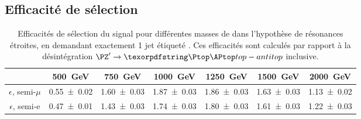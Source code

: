 
\subsection{Efficacité de sélection} \label{sec:zprime_eff_sel}

\begin{table}[p!] \centering
  \begin{tabular}{ccccccc} \toprule
    & \SI{500}{\GeV} & \SI{750}{\GeV} & \SI{1000}{\GeV} & \SI{1250}{\GeV} & \SI{1500}{\GeV} & \SI{2000}{\GeV} \\ \midrule
    $\epsilon$, semi-$\mu$ & \num{0.55 \pm 0.02} & \num{1.60 \pm 0.03} & \num{1.87 \pm 0.03} & \num{1.86 \pm 0.03} & \num{1.63 \pm 0.03} & \num{1.13 \pm 0.02} \\
    $\epsilon$, semi-e & \num{0.47 \pm 0.01} & \num{1.43 \pm 0.03} & \num{1.74 \pm 0.03} & \num{1.80 \pm 0.03} & \num{1.61 \pm 0.03} & \num{1.22 \pm 0.03} \\ \bottomrule
  \end{tabular}
  \caption{Efficacités de sélection du signal pour différentes masses de \zprime dans l'hypothèse de résonances étroites, en demandant exactement 1 jet étiqueté \Pbottom. Ces efficacités sont calculés par rapport à la désintégration $\zprime \rightarrow \ttbar$ inclusive.}
  \label{tab:eff_narrow_1b}
\end{table}

